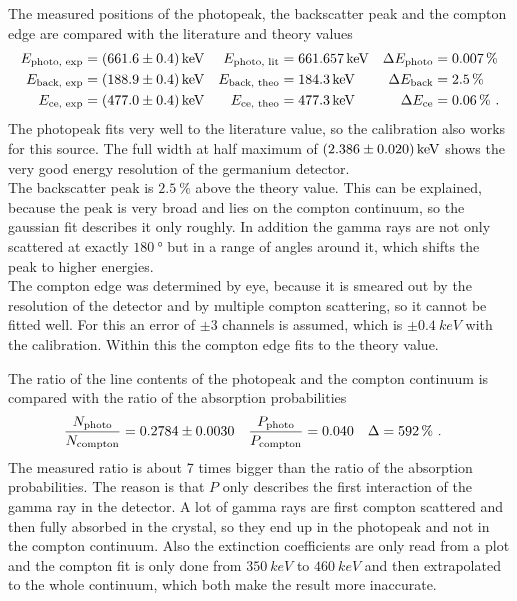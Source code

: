 The measured positions of the photopeak, the backscatter peak and the compton edge are compared with the literature and theory values
\begin{align}
    E_\text{photo, exp} &= \SI{661.6 \pm 0.4}{keV} & E_\text{photo, lit} &= \SI{661.657}{keV} & \Delta E_\text{photo} &= \SI{0.007}{\percent} \\
    E_\text{back, exp} &= \SI{188.9 \pm 0.4}{keV} & E_\text{back, theo} &= \SI{184.3}{keV} & \Delta E_\text{back} &= \SI{2.5}{\percent} \\
    E_\text{ce, exp} &= \SI{477.0 \pm 0.4}{keV} & E_\text{ce, theo} &= \SI{477.3}{keV} & \Delta E_\text{ce} &= \SI{0.06}{\percent} \ .
\end{align}
The photopeak fits very well to the literature value, so the calibration also works for this source.
The full width at half maximum of $\SI{2.386 \pm 0.020}{keV}$ shows the very good energy resolution of the germanium detector.
\\
The backscatter peak is $\SI{2.5}{\percent}$ above the theory value.
This can be explained, because the peak is very broad and lies on the compton continuum, so the gaussian fit describes it only roughly.
In addition the gamma rays are not only scattered at exactly $\SI{180}{\degree}$ but in a range of angles around it, which shifts the peak to higher energies.
\\
The compton edge was determined by eye, because it is smeared out by the resolution of the detector and by multiple compton scattering, so it cannot be fitted well.
For this an error of $\pm 3$ channels is assumed, which is $\pm\SI{0.4}{keV}$ with the calibration.
Within this the compton edge fits to the theory value.

The ratio of the line contents of the photopeak and the compton continuum is compared with the ratio of the absorption probabilities
\begin{align}
    \frac{N_\text{photo}}{N_\text{compton}} &= \num{0.2784 \pm 0.0030} & \frac{P_\text{photo}}{P_\text{compton}} &= \num{0.040} & \Delta &= \SI{592}{\percent} \ .
\end{align}
The measured ratio is about 7 times bigger than the ratio of the absorption probabilities.
The reason is that $P$ only describes the first interaction of the gamma ray in the detector.
A lot of gamma rays are first compton scattered and then fully absorbed in the crystal, so they end up in the photopeak and not in the compton continuum.
Also the extinction coefficients are only read from a plot and the compton fit is only done from $\SI{350}{keV}$ to $\SI{460}{keV}$ and then extrapolated to the whole continuum,
which both make the result more inaccurate.

